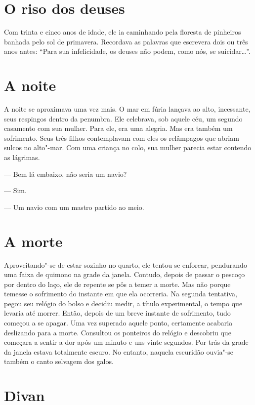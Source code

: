 \section{O riso dos deuses}

Com trinta e cinco anos de idade, ele ia caminhando pela floresta de
pinheiros banhada pelo sol de primavera. Recordava as palavras que
escrevera dois ou três anos antes: ``Para sua infelicidade, os deuses
não podem, como nós, se suicidar\ldots{}''.

\section{A noite}

A noite se aproximava uma vez mais. O mar em fúria lançava ao alto,
incessante, seus respingos dentro da penumbra. Ele celebrava, sob
aquele céu, um segundo casamento com sua mulher. Para ele, era uma
alegria. Mas era também um sofrimento. Seus três filhos contemplavam
com eles os relâmpagos que abriam sulcos no alto"-mar. Com uma criança
no colo, sua mulher parecia estar contendo as lágrimas.

--- Bem lá embaixo, não seria um navio?

--- Sim.

--- Um navio com um mastro partido ao meio.

\section{A morte}

Aproveitando"-se de estar sozinho no quarto, ele tentou se enforcar,
pendurando uma faixa de quimono na grade da janela. Contudo, depois de
passar o pescoço por dentro do laço, ele de repente se pôs a temer a
morte. Mas não porque temesse o sofrimento do instante em que ela
ocorreria. Na segunda tentativa, pegou seu relógio do bolso e decidiu
medir, a título experimental, o tempo que levaria até morrer. Então,
depois de um breve instante de sofrimento, tudo começou a se apagar.
Uma vez superado aquele ponto, certamente acabaria deslizando para a
morte. Consultou os ponteiros do relógio e descobriu que começara a
sentir a dor após um minuto e uns vinte segundos. Por trás da grade da
janela estava totalmente escuro. No entanto, naquela escuridão ouvia"-se
também o canto selvagem dos galos.

\section{Divan}

